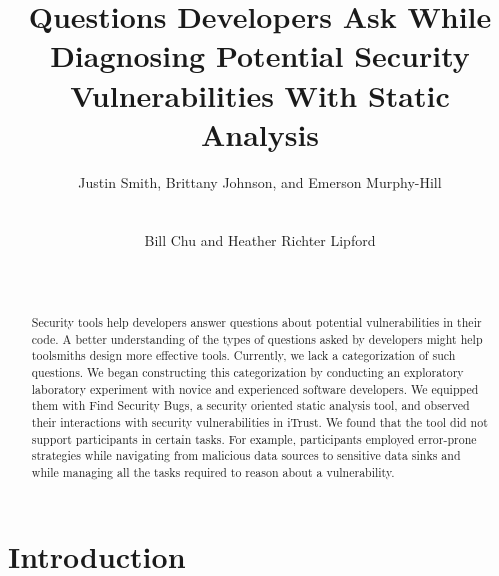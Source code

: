 \documentclass{acm_proc_article-sp}
\newcommand{\blind}[1]{#1}
\begin{document}
\title{Questions Developers Ask While Diagnosing Potential Security Vulnerabilities With Static Analysis}

\author{
\alignauthor Justin Smith, Brittany Johnson, and Emerson Murphy-Hill\\
\\
 \\
\alignauthor Bill Chu and Heather Richter Lipford\\
\\
\\
}

\maketitle


\begin{abstract}

Security tools help developers answer questions about potential vulnerabilities in their code. 
A better understanding of the types of questions asked by developers might help toolsmiths design more effective tools.
Currently, we lack a categorization of such questions. 
We began constructing this categorization by conducting an exploratory laboratory experiment with novice and experienced software developers.
We equipped them with Find Security Bugs, a security oriented static analysis tool, and observed their interactions with security vulnerabilities in iTrust.
We found that the tool did not support participants in certain tasks.
For example, participants employed error-prone strategies while navigating from malicious data sources to sensitive data sinks and while managing all the tasks required to reason about a vulnerability. 

\end{abstract}


\section{Introduction}
\end{document}
